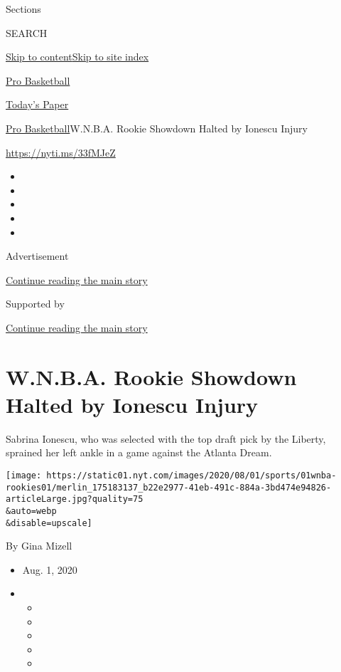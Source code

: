 Sections

SEARCH

\protect\hyperlink{site-content}{Skip to
content}\protect\hyperlink{site-index}{Skip to site index}

\href{https://www.nytimes.com/section/sports/basketball}{Pro Basketball}

\href{https://myaccount.nytimes.com/auth/login?response_type=cookie\&client_id=vi}{}

\href{https://www.nytimes.com/section/todayspaper}{Today's Paper}

\href{/section/sports/basketball}{Pro Basketball}\textbar{}W.N.B.A.
Rookie Showdown Halted by Ionescu Injury

\url{https://nyti.ms/33fMJeZ}

\begin{itemize}
\item
\item
\item
\item
\item
\end{itemize}

Advertisement

\protect\hyperlink{after-top}{Continue reading the main story}

Supported by

\protect\hyperlink{after-sponsor}{Continue reading the main story}

\hypertarget{wnba-rookie-showdown-halted-by-ionescu-injury}{%
\section{W.N.B.A. Rookie Showdown Halted by Ionescu
Injury}\label{wnba-rookie-showdown-halted-by-ionescu-injury}}

Sabrina Ionescu, who was selected with the top draft pick by the
Liberty, sprained her left ankle in a game against the Atlanta Dream.

\texttt{[image: https://static01.nyt.com/images/2020/08/01/sports/01wnba-rookies01/merlin\_175183137\_b22e2977-41eb-491c-884a-3bd474e94826-articleLarge.jpg?quality=75\\\&auto=webp\\\&disable=upscale]}

By Gina Mizell

\begin{itemize}
\item
  Aug. 1, 2020
\item
  \begin{itemize}
  \item
  \item
  \item
  \item
  \item
  \end{itemize}
\end{itemize}

